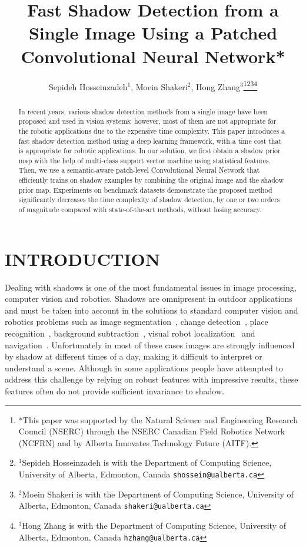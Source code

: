\documentclass[letterpaper, 10 pt, conference]{ieeeconf}
\title{\LARGE \bf
Fast Shadow Detection from a Single Image Using a Patched Convolutional Neural Network*
}
\author{Sepideh Hosseinzadeh$^{1}$, Moein Shakeri$^{2}$, Hong Zhang$^{3}$\thanks{*This paper was supported by the Natural Science and Engineering Research Council (NSERC) through the NSERC Canadian Field Robotics Network (NCFRN) and by Alberta Innovates Technology Future (AITF).}\thanks{$^{1}$Sepideh Hosseinzadeh is with the Department of Computing Science, University of Alberta, Edmonton, Canada
        {\tt\small shossein@ualberta.ca}}\thanks{$^{2}$Moein Shakeri is with the Department of Computing Science, University of Alberta, Edmonton, Canada
        {\tt\small shakeri@ualberta.ca}}\thanks{$^{3}$Hong Zhang is with the Department of Computing Science, University of Alberta, Edmonton, Canada
        {\tt\small hzhang@ualberta.ca}}}
\begin{document}
\maketitle
\thispagestyle{empty}
\pagestyle{empty}


\begin{abstract}
In recent years, various shadow detection methods from a single image have been proposed and used in vision systems; however, most of them are not appropriate for the robotic applications due to the expensive time complexity. This paper introduces a fast shadow detection method using a deep learning framework, with a time cost that is appropriate for robotic applications. In our solution, we first obtain a shadow prior map with the help of multi-class support vector machine using statistical features. Then, we use a semantic-aware
patch-level Convolutional Neural Network that efficiently trains on shadow examples by combining the original image and the shadow prior map. Experiments on benchmark datasets demonstrate the proposed method significantly decreases the time complexity of shadow detection, by one or two orders of magnitude compared with state-of-the-art methods, without losing accuracy.  

\end{abstract}


\section{INTRODUCTION}

Dealing with shadows is one of the most fundamental issues in image processing, computer vision and robotics. Shadows are omnipresent in outdoor applications and must be taken into account in the solutions to standard computer vision and robotics problems such as image segmentation~\cite{segment}, change detection~\cite{shakeri_ICCV}, place recognition~\cite{place_rec}, background subtraction~\cite{shakeri_small,shakeri_corola}, visual robot localization~\cite{Corke,shakeri_dynamic} and navigation~\cite{Maddern}. Unfortunately in most of these cases images are strongly influenced by shadow at different times of a day, making it difficult to interpret or understand a scene. Although in some applications people have attempted to address this challenge by relying on robust features with impressive results, these features often do not provide sufficient invariance to shadow.
\end{document}
